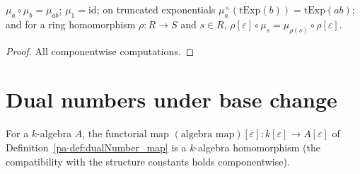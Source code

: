 \begin{lemma}
  \label{pa-lem:mumford_scaling_props}
  \leanok

  \(\mu_a \circ \mu_b = \mu_{ab}\); \(\mu_1 = \mathrm{id}\); on truncated exponentials
  \(\mu_a^\times(\mathrm{tExp}(b)) = \mathrm{tExp}(ab)\); and for a ring homomorphism
  \(\rho : R \to S\) and \(s \in R\),
  \(\rho[\varepsilon] \circ \mu_s = \mu_{\rho(s)} \circ \rho[\varepsilon]\).
\end{lemma}
\begin{proof}
  \leanok
  All componentwise computations.
\end{proof}

\section{Dual numbers under base change}

\begin{definition}
  \label{pa-def:dualNumber_mapAlgHom}
  \leanok

  For a \(k\)-algebra \(A\), the functorial map
  \((\text{algebra map})[\varepsilon] : k[\varepsilon] \to A[\varepsilon]\) of
  Definition~\ref{pa-def:dualNumber_map} is a \(k\)-algebra homomorphism (the
  compatibility with the structure constants holds componentwise).
\end{definition}

